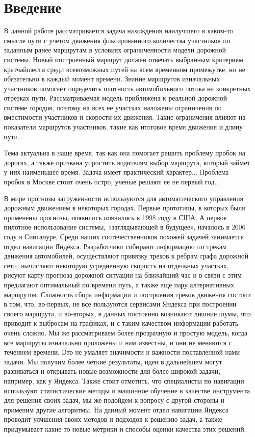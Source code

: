 \documentclass[12pt, a4paper]{article}
\begin{document}
\newpage
\pagestyle{plain}
\tableofcontents{}

\newpage	

\section*{Введение}

В данной работе рассматривается задача нахождения наилучшего в каком-то смысле пути с учетом движения фиксированного количества участников по заданным ранее маршрутам в условиях ограниченности модели дорожной системы. Новый построенный маршрут должен отвечать выбранным критериям кратчайшести среди всевозможных путей на всем временном промежутке, но не обязательно в каждый момент времени. Знание маршрутов изначальных участников помогает определить плотность автомобильного потока на конкретных отрезках пути. Рассматриваемая модель приближена к реальной дорожной системе городов, поэтому на всех ее участках наложены ограничения по вместимости участников и скорости их движения. Такие ограничения влияют на показатели маршрутов участников, такие как итоговое время движения и длину пути. 


Тема актуальна в наше время, так как она помогает решить проблему пробок на дорогах, а также призвана упростить водителям выбор маршрута, который займет у них наименьшее время. Задача имеет практический характер... Проблема пробок в Москве стоит очень остро, ученые решают ее не первый год..

В мире прогнозы загруженности используются для автоматического управления дорожным движением в некоторых городах. Первые прототипы, в которых были применены прогнозы, появились появились в 1998 году в США. А первое пилотное использование системы, «заглядывающей в будущее», началось в 2006 году в Сингапуре. Среди наших соотечественников похожей задачей занимается отдел навигации Яндекса. Разработчики собирают информацию по трекам движения автомобилей, осуществляют привязку треков к ребрам графа дорожной сети, вычисляют некоторую усредненную скорость на отдельных участках, рисуют карту прогноза дорожной ситуации на ближайший час и в связи с этим предлагают оптимальный по времени путь, а также еще пару алтернативных маршрутов. Сложность сбора информации и построения треков движения состоит в том, что, во-первых, не все пользуются сервисами Яндекса при построении своего маршрута, и во-вторых, в данных постоянно возникают лишние шумы, что приводит к выбросам на графиках, и с таким качеством информации работать очень сложно. Мы же рассматриваем более прозрачную и простую модель, когда все маршруты изначально проложены и нам известны, и они не меняются с течением времени. Это не умаляет значимости и важности поставленной нами задачи. Мы получим более четкие результаты, идеи в дальнейшем могут развиваться и открывать новые возможности для более широкой задачи, например, как у Яндекса. Также стоит отметить, что специалисты по навигации используют статистические методы и машинное обучение в качестве инструмента для решения своих задач, мы же подойдем к вопросу с другой стороны и применим другие алгоритмы. На данный момент отдел навигации Яндекса проводит улчшения своих методов и подходов к решению задач, а также придумывает какие-то новые метрики и способы оценки качества этих решений.
\end{document}
